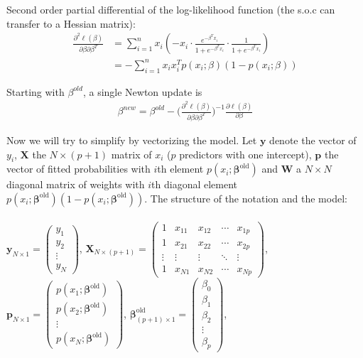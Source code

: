     \documentclass[12pt,fleqn,a4paper]{article}%
\theoremstyle{definition}
\theoremstyle{plain}
\numberwithin{equation}{section}
\begin{document}
Second order partial differential of the log-likelihood function (the s.o.c can transfer to a Hessian matrix):
\begin{align*}
\frac{\partial^{2} \ell(\beta)}{\partial \beta \partial \beta^{T}}
 & = \sum\limits_{i=1}^{n} x_{i}(-x_{i} \cdot \frac{e^{-\beta^{T} x_{i}}}{1+e^{-\beta^{T} x_{i}}} \cdot \frac{1}{1+e^{-\beta^{T} x_{i}}}) \\
 & = -\sum\limits_{i=1}^{n} x_{i}x_{i}^{T} p(x_{i};\beta) (1-p(x_{i};\beta))
\end{align*}

Starting with $\beta^{old}$, a single Newton update is
\begin{gather*}
\beta^{new} = \beta^{old} - \bigg(\frac{\partial^{2} \ell(\beta)}{\partial \beta \partial \beta^{T}}\bigg)^{-1} \frac{\partial \ell(\beta)}{\partial \beta}
\end{gather*}

Now we will try to simplify by vectorizing the model. Let $\mathbf{y}$ denote the vector of $y_{i}$,
$\mathbf{X}$ the $N \times (p+1)$ matrix of $x_{i}$ ($p$ predictors with one intercept),
$\mathbf{p}$ the vector of fitted probabilities with $i$th element $p(x_{i};\boldsymbol{\beta}^{\text{old}})$ and
$\mathbf{W}$ a $N \times N$ diagonal matrix of weights with $i$th diagonal element $p(x_{i};\boldsymbol{\beta}^{\text{old}})(1-p(x_{i};\boldsymbol{\beta}^{\text{old}}))$.
The structure of the notation and the model: ~\\~\\

$
\mathbf{y}_{N \times 1} = \begin{pmatrix}
  y_{1}  \\
  y_{2}  \\
  \vdots  \\
  y_{N}
 \end{pmatrix}
$,
$
\mathbf{X}_{N \times (p+1)} = \begin{pmatrix}
  1 & x_{11} & x_{12} & \cdots & x_{1p} \\
  1 & x_{21} & x_{22} & \cdots & x_{2p} \\
  \vdots & \vdots & \vdots & \ddots & \vdots  \\
  1 & x_{N1} & x_{N2} & \cdots & x_{Np}
 \end{pmatrix}
$, ~\\

$
\mathbf{p}_{N \times 1} = \begin{pmatrix}
  p(x_{1};\boldsymbol{\beta}^{\text{old}})  \\
  p(x_{2};\boldsymbol{\beta}^{\text{old}})  \\
  \vdots  \\
  p(x_{N};\boldsymbol{\beta}^{\text{old}})
 \end{pmatrix}
$,
$
\boldsymbol{\beta}^{\text{old}}_{(p+1) \times 1} = \begin{pmatrix}
  \beta_{0}  \\
  \beta_{1}  \\
  \beta_{2}  \\
  \vdots  \\
  \beta_{p}
 \end{pmatrix}
$,
\end{document}
